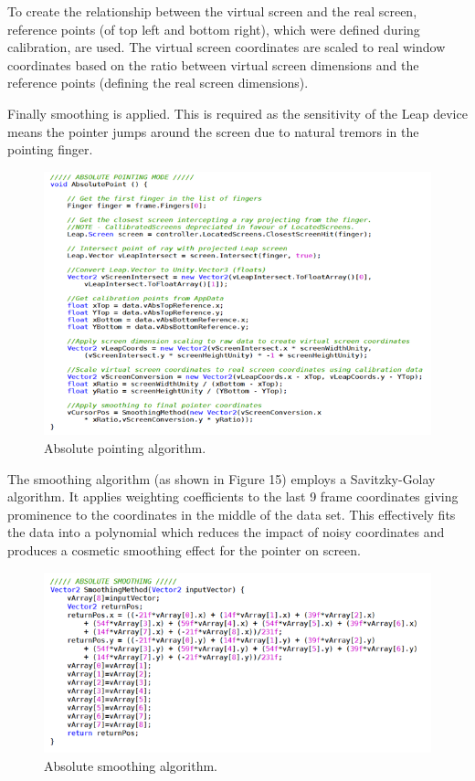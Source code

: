 \documentclass[titlepage]{article}
\begin{document}
To create the relationship between the virtual screen and the real screen, reference points (of top left and bottom right), which were defined during calibration, are used. The virtual screen coordinates are scaled to real window coordinates based on the ratio between virtual screen dimensions and the reference points (defining the real screen dimensions).
 
Finally smoothing is applied. This is required as the sensitivity of the Leap device means the pointer jumps around the screen due to natural tremors in the pointing finger.

\begin{figure}[!h]
    \centering
    \includegraphics[width=7.0in]{Figure_14}
    \caption{Absolute pointing algorithm.}
\end{figure}

The smoothing algorithm (as shown in Figure 15) employs a Savitzky-Golay algorithm. It applies weighting coefficients to the last 9 frame coordinates giving prominence to the coordinates in the middle of the data set. This effectively fits the data into a polynomial which reduces the impact of noisy coordinates and produces a cosmetic smoothing effect for the pointer on screen.

\begin{figure}[!h]
    \centering
    \includegraphics[width=7.0in]{Figure_15}
    \caption{Absolute smoothing algorithm.}
\end{figure}
\end{document}
